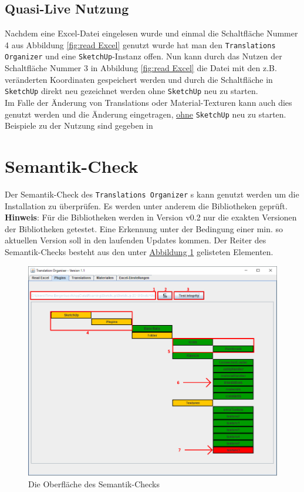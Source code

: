 \documentclass{book}
\newcommand{\sketchup}{\texttt{SketchUp}\xspace}
\newcommand{\assisttool}{\texttt{Translations Organizer}\xspace}
\newcommand{\hinweis}[1]{\newline \textbf{Hinweis}: #1 \newline}
\begin{document}
			\subsection{Quasi-Live Nutzung}
				Nachdem eine Excel-Datei eingelesen wurde und einmal die Schaltfläche Nummer 4 aus Abbildung \ref{fig:read Excel} genutzt wurde hat man den \assisttool und eine \sketchup-Instanz offen. Nun kann durch das Nutzen der Schaltfläche Nummer 3 in Abbildung \ref{fig:read Excel} die Datei mit den z.B. veränderten Koordinaten gespeichert werden und durch die Schaltfläche in \sketchup direkt neu gezeichnet werden ohne \sketchup neu zu starten.\\
				Im Falle der Änderung von Translations oder Material-Texturen kann auch dies genutzt werden und die Änderung eingetragen, \underline{ohne} \sketchup neu zu starten. Beispiele zu der Nutzung sind gegeben in %
		\section{Semantik-Check}\label{semantic check}
			Der Semantik-Check des \assisttool s kann genutzt werden um die Installation zu überprüfen. Es werden unter anderem die Bibliotheken geprüft. 
			\hinweis{Für die Bibliotheken werden in Version v0.2 nur die exakten Versionen der Bibliotheken getestet. Eine Erkennung unter der Bedingung einer min. so aktuellen Version soll in den laufenden Updates kommen.}
			Der Reiter des Semantik-Checks besteht aus den unter \hyperref[fig:semantik check]{Abbildung \ref{fig:semantik check}} gelisteten Elementen.				
			
			\begin{figure}
				\centering
				\includegraphics[scale=0.48]{pics/assisttool/semantik-check.png}
				\caption{Die Oberfläche des Semantik-Checks}
				\label{fig:semantik check}
			\end{figure}
		
\end{document}
